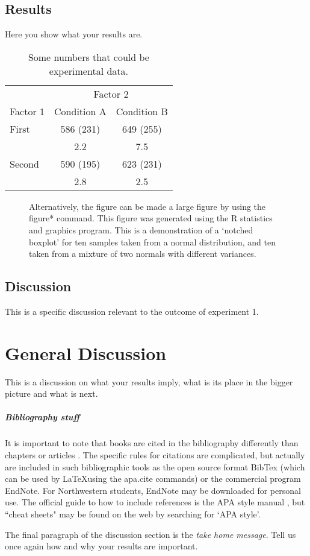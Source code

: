 \documentclass[jou]{apa6} %
\begin{document}
\subsection{Results}

Here you show what your results are.

\begin{table}[tbp]
\caption{Some numbers that could be experimental data.}
\label{tab:tab2}
\begin{tabular}{lcc}\hline
          & \multicolumn{2}{c}{Factor 2} \\ \cline{2-3}
Factor 1  & Condition A  & Condition B   \\ \hline
First     & 586 (231)    & 649 (255)     \\
          &    2.2       &    7.5        \\
Second    & 590 (195)    & 623 (231)     \\
          &    2.8       &    2.5        \\ \hline
\end{tabular}
\end{table}


\begin{figure*}[htbp]
\begin{center}
\caption{Alternatively, the figure can be made a large figure by using the figure* command. This figure was generated using the R statistics and graphics program.  This is a demonstration of a `notched boxplot' for ten samples taken from a normal distribution, and ten taken from a mixture of two normals with different variances. }
\label{fig:bigfig}
\end{center}
\end{figure*}


\subsection{Discussion}

This is a specific discussion relevant to the outcome of experiment 1.

\section{General Discussion}
This is a discussion on what your results imply, what is its place in the bigger picture and what is next.%

\subparagraph{Bibliography stuff}
It is important to note that books \cite{leary} are cited in the bibliography differently than chapters \cite{rev:ea07} or articles \cite{killeen}.  The specific rules for citations are complicated, but actually  are included in such bibliographic tools as the open source format BibTex (which can be used by \LaTeX using the  apa.cite commands) or the commercial program EndNote.  For Northwestern students, EndNote may be downloaded for personal use.  The official guide to how to include references is the APA style manual \cite{apa:6}, but ``cheat sheets" may be found on the web by searching for `APA style'.

The final paragraph of the discussion section is the \emph{take home message}.  Tell us once again how and why your results are important.


\end{document}
